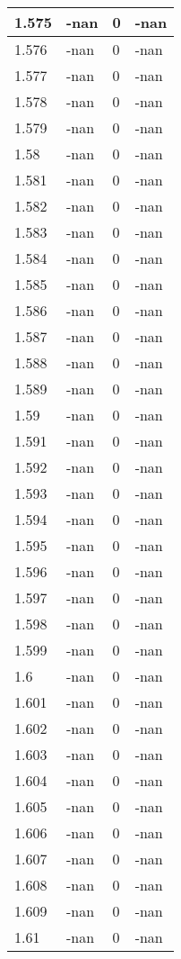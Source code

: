 \documentclass[a4paper,14pt]{extarticle}
\begin{document}
\begin{longtable}{||m{3cm}||m{3cm}|m{3cm}||m{3cm}||}
\hline
1.575 & -nan & 0 & -nan\\
\hline
1.576 & -nan & 0 & -nan\\
\hline
1.577 & -nan & 0 & -nan\\
\hline
1.578 & -nan & 0 & -nan\\
\hline
1.579 & -nan & 0 & -nan\\
\hline
1.58 & -nan & 0 & -nan\\
\hline
1.581 & -nan & 0 & -nan\\
\hline
1.582 & -nan & 0 & -nan\\
\hline
1.583 & -nan & 0 & -nan\\
\hline
1.584 & -nan & 0 & -nan\\
\hline
1.585 & -nan & 0 & -nan\\
\hline
1.586 & -nan & 0 & -nan\\
\hline
1.587 & -nan & 0 & -nan\\
\hline
1.588 & -nan & 0 & -nan\\
\hline
1.589 & -nan & 0 & -nan\\
\hline
1.59 & -nan & 0 & -nan\\
\hline
1.591 & -nan & 0 & -nan\\
\hline
1.592 & -nan & 0 & -nan\\
\hline
1.593 & -nan & 0 & -nan\\
\hline
1.594 & -nan & 0 & -nan\\
\hline
1.595 & -nan & 0 & -nan\\
\hline
1.596 & -nan & 0 & -nan\\
\hline
1.597 & -nan & 0 & -nan\\
\hline
1.598 & -nan & 0 & -nan\\
\hline
1.599 & -nan & 0 & -nan\\
\hline
1.6 & -nan & 0 & -nan\\
\hline
1.601 & -nan & 0 & -nan\\
\hline
1.602 & -nan & 0 & -nan\\
\hline
1.603 & -nan & 0 & -nan\\
\hline
1.604 & -nan & 0 & -nan\\
\hline
1.605 & -nan & 0 & -nan\\
\hline
1.606 & -nan & 0 & -nan\\
\hline
1.607 & -nan & 0 & -nan\\
\hline
1.608 & -nan & 0 & -nan\\
\hline
1.609 & -nan & 0 & -nan\\
\hline
1.61 & -nan & 0 & -nan\\

\end{longtable}
\end{document}
